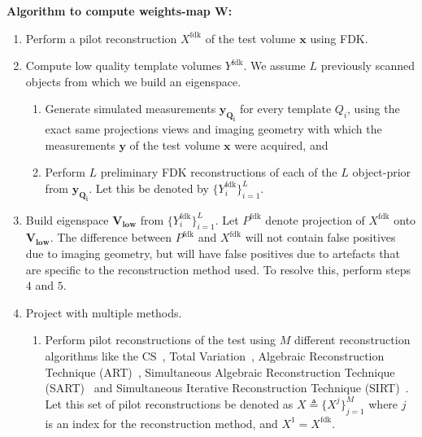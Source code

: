 \documentclass[journal]{IEEEtran}
\begin{document}
\textbf{Algorithm to compute weights-map $\boldsymbol{W}$:}
\label{sec:thealgo}
\begin{enumerate}

\item Perform a pilot reconstruction $X^{\text{fdk}}$ of the
  test volume $\boldsymbol{x}$ using FDK.

\item Compute low quality template volumes $Y^\text{fdk}$. 
We assume $L$ previously scanned objects from which we build
an eigenspace. 
\vspace{-0.1cm}

\begin{enumerate}
  \item Generate simulated measurements $\boldsymbol{y_{Q_i}}$ for
    every template $Q_i$, using the exact same projections views and
    imaging geometry with which the measurements $\boldsymbol{y}$ of
    the test volume $\boldsymbol{x}$ were acquired, and
\item Perform $L$ preliminary FDK reconstructions of each of the $L$
  object-prior from $\boldsymbol{y_{Q_i}}$.  Let this be denoted by
  $\{Y^{\text{fdk}}_i\}_{i=1}^L$.
  \end{enumerate}
\item Build eigenspace $\boldsymbol{V_{\text{low}}}$ from
  $\{Y^{\text{fdk}}_i\}_{i=1}^L$.  Let $P^{\text{fdk}}$ denote
  projection of $X^{\text{fdk}}$ onto
  $\boldsymbol{V_{\text{low}}}$. The difference between
  $P^{\text{fdk}}$ and $X^{\text{fdk}}$ will not contain false
  positives due to imaging geometry, but will have false positives due
  to artefacts that are specific to the reconstruction method used. To
  resolve this, perform steps $4$ and $5$.
\item Project with multiple methods.
  \begin{enumerate}
  \item Perform pilot reconstructions of the test using $M$ different
    reconstruction algorithms like the CS~\cite{lasso}, Total
    Variation~\cite{TV}, Algebraic Reconstruction Technique
    (ART)~\cite{art}, Simultaneous Algebraic Reconstruction Technique
    (SART)~\cite{sart} and Simultaneous Iterative Reconstruction
    Technique (SIRT)~\cite{sirt}. Let this set of pilot
    reconstructions be denoted as $X \triangleq \{X^j\}_{j=1}^M$ where
    $j$ is an index for the reconstruction method, and $X^1 =
    X^{\text{fdk}}$.


\end{enumerate}
\end{enumerate}
\end{document}
